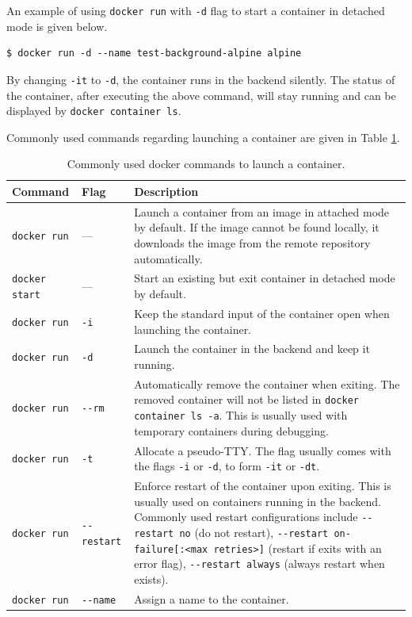 An example of using \verb|docker run| with \verb|-d| flag to start a container in detached mode is given below.
\begin{lstlisting}
$ docker run -d --name test-background-alpine alpine
\end{lstlisting}
By changing \verb|-it| to \verb|-d|, the container runs in the backend silently. The status of the container, after executing the above command, will stay running and can be displayed by \verb|docker container ls|.

Commonly used commands regarding launching a container are given in Table \ref{ch:vac:tab:launchcontainer}.

\begin{table}[!htb]
	\centering \caption{Commonly used docker commands to launch a container.}\label{ch:vac:tab:launchcontainer}
	\begin{tabularx}{\textwidth}{llX}
		\hline
		Command & Flag & Description \\ \hline
		\verb|docker run| & --- & Launch a container from an image in attached mode by default. If the image cannot be found locally, it downloads the image from the remote repository automatically. \\
        \verb|docker start| & --- & Start an existing but exit container in detached mode by default. \\
        \verb|docker run| & \verb|-i| & Keep the standard input of the container open when launching the container. \\ 
        \verb|docker run| & \verb|-d| & Launch the container in the backend and keep it running. \\ 
        \verb|docker run| & \verb|--rm| & Automatically remove the container when exiting. The removed container will not be listed in \verb|docker container ls -a|. This is usually used with temporary containers during debugging. \\ 
        \verb|docker run| & \verb|-t| & Allocate a pseudo-TTY. The flag usually comes with the flags \verb|-i| or \verb|-d|, to form \verb|-it| or \verb|-dt|. \\ 
        \verb|docker run| & \verb|--restart| & Enforce restart of the container upon exiting. This is usually used on containers running in the backend. Commonly used restart configurations include \verb|--restart no| (do not restart), \verb|--restart on-failure[:<max retries>]| (restart if exits with an error flag), \verb|--restart always| (always restart when exists). \\ 
        \verb|docker run| & \verb|--name| & Assign a name to the container. \\
		\hline
	\end{tabularx}
\end{table}

